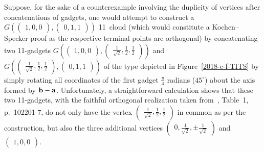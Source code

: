 Suppose, for the sake of a counterexample involving the duplicity of vertices after concatenations of gadgets, one would attempt to construct a
$G
\left(
\begin{pmatrix}
1,0,0
\end{pmatrix}
,
\begin{pmatrix}
0,1,1
\end{pmatrix}
\right)
$
11~cloud (which would constitute a Kochen--Specker proof as the respective terminal points are orthogonal)
by concatenating two 11-gadgets
$
G
\left(
\begin{pmatrix}
1,0,0
\end{pmatrix}
,
\begin{pmatrix}
 \frac{1}{\sqrt{2}},\frac{1}{2},\frac{1}{2}
\end{pmatrix}
\right)
$
and $
G
\left(
\begin{pmatrix}
 \frac{1}{\sqrt{2}},\frac{1}{2},\frac{1}{2}
\end{pmatrix}
,
\begin{pmatrix}
0,1,1
\end{pmatrix}
\right)
$
of the type depicted in Figure~\ref{2018-c-f-TITS}
by simply rotating all coordinates of the first gadget $\frac{\pi}{4}$ radians ($45^\circ$) about the axis formed by
${\bf b}-{\bf a}$.
Unfortunately, a straightforward calculation shows that these two 11-gadgets, with the faithful orthogonal realization taken from~\cite{2015-AnalyticKS}, Table~1, p.~102201-7,
do not only have the vertex $\begin{pmatrix}
 \frac{1}{\sqrt{2}},\frac{1}{2},\frac{1}{2}
\end{pmatrix}$
in common as per the construction, but also the three additional vertices
$
\begin{pmatrix}
0,\frac{1}{\sqrt{2}},\pm \frac{1}{\sqrt{2}}
\end{pmatrix}
$
and
 $\begin{pmatrix}
 1,0,0
\end{pmatrix}
$.

